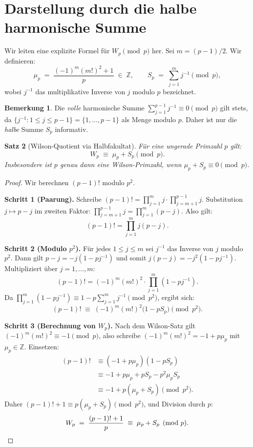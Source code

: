 \documentclass[12pt,a4paper]{amsart}
\newtheorem{theorem}{Satz}[section]
\theoremstyle{definition}
\newtheorem{bemerkung}[theorem]{Bemerkung}
\newcommand{\Z}{\mathbb{Z}}
\begin{document}
\section{Darstellung durch die halbe harmonische Summe}

Wir leiten eine explizite Formel für $W_p \pmod p$ her.
Sei $m = (p-1)/2$.  Wir definieren:
\[
  \mu_p \;=\; \frac{(-1)^m (m!)^2 + 1}{p} \;\in\; \Z,
  \qquad
  S_p \;=\; \sum_{j=1}^{m} j^{-1} \pmod p,
\]
wobei $j^{-1}$ das multiplikative Inverse von $j$ modulo $p$ bezeichnet.

\begin{bemerkung}
  Die \emph{volle} harmonische Summe $\sum_{j=1}^{p-1} j^{-1} \equiv 0 \pmod{p}$
  gilt stets, da $\{j^{-1} \colon 1 \leq j \leq p-1\} = \{1, \ldots, p-1\}$
  als Menge modulo $p$.  Daher ist nur die \emph{halbe} Summe $S_p$ informativ.
\end{bemerkung}

\begin{theorem}[Wilson-Quotient via Halbfakultat]\label{satz:harmonisch}
  Für eine ungerade Primzahl $p$ gilt:
  \[
    W_p \;\equiv\; \mu_p + S_p \pmod{p}.
  \]
  Insbesondere ist $p$ genau dann eine Wilson-Primzahl, wenn
  $\mu_p + S_p \equiv 0 \pmod{p}$.
\end{theorem}

\begin{proof}
  Wir berechnen $(p-1)!$ modulo $p^2$.

  \textbf{Schritt 1 (Paarung).}
  Schreibe $(p-1)! = \prod_{j=1}^m j \cdot \prod_{j=m+1}^{p-1} j$.
  Substitution $j \mapsto p-j$ im zweiten Faktor:
  $\prod_{j=m+1}^{p-1} j = \prod_{j=1}^m (p-j)$.
  Also gilt:
  \[
    (p-1)! = \prod_{j=1}^m j(p-j).
  \]

  \textbf{Schritt 2 (Modulo $p^2$).}
  Für jedes $1 \leq j \leq m$ sei $j^{-1}$ das Inverse von $j$ modulo $p^2$.
  Dann gilt $p - j = -j(1 - pj^{-1})$ und somit $j(p-j) = -j^2(1-pj^{-1})$.
  Multipliziert über $j = 1, \ldots, m$:
  \[
    (p-1)! = (-1)^m (m!)^2 \cdot \prod_{j=1}^m (1 - pj^{-1}).
  \]
  Da $\prod_{j=1}^m (1-pj^{-1}) \equiv 1 - p\sum_{j=1}^m j^{-1} \pmod{p^2}$,
  ergibt sich:
  \[
    (p-1)! \;\equiv\; (-1)^m(m!)^2 \bigl(1 - pS_p\bigr) \pmod{p^2}.
  \]

  \textbf{Schritt 3 (Berechnung von $W_p$).}
  Nach dem Wilson-Satz gilt $(-1)^m(m!)^2 \equiv -1 \pmod{p}$,
  also schreibe $(-1)^m(m!)^2 = -1 + p\mu_p$ mit $\mu_p \in \Z$.
  Einsetzen:
  \begin{align*}
    (p-1)! &\equiv (-1+p\mu_p)(1-pS_p)\\
           &\equiv -1 + p\mu_p + pS_p - p^2\mu_pS_p\\
           &\equiv -1 + p(\mu_p + S_p) \pmod{p^2}.
  \end{align*}
  Daher $(p-1)! + 1 \equiv p(\mu_p + S_p) \pmod{p^2}$, und Division durch $p$:
  \[
    W_p \;=\; \frac{(p-1)!+1}{p} \;\equiv\; \mu_p + S_p \pmod p. \qedhere
  \]
\end{proof}
\end{document}
